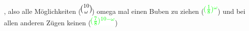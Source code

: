 \documentclass[11pt]{article}
\begin{document}
\begin{itemize}
, also alle Möglichkeiten (\includegraphics[width=.9\linewidth]{201301ad-1800443389FLU.png}) omega mal einen Buben zu ziehen (\includegraphics[width=.9\linewidth]{201212ad-1310561774BMy.png}) und bei allen anderen Zügen keinen (\includegraphics[width=.9\linewidth]{201212ad-1312321774AgH.png})



\end{itemize}
\end{document}
